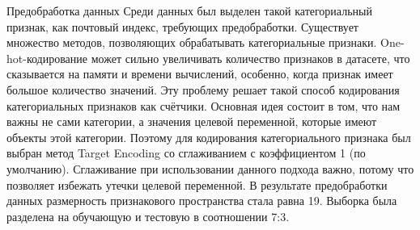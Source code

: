 \documentclass[12pt]{article}
\begin{document}
\begin{section}{Предобработка данных}
Среди данных был выделен такой категориальный признак, как почтовый индекс, требующих предобработки. Существует множество методов, позволяющих обрабатывать категориальные признаки. One-hot-кодирование может сильно увеличивать количество признаков в датасете, что сказывается на памяти и времени вычислений, особенно, когда признак имеет большое количество значений. Эту проблему решает такой способ кодирования категориальных признаков как счётчики. Основная идея состоит в том, что нам важны не сами категории, а значения целевой переменной, которые имеют объекты этой категории. Поэтому для кодирования категориального признака был выбран метод Target Encoding со сглаживанием с коэффициентом 1 (по умолчанию). Сглаживание при использовании данного подхода важно, потому что позволяет избежать утечки целевой переменной. В результате предобработки данных размерность признакового пространства стала равна 19. Выборка была разделена на обучающую и тестовую в соотношении 7:3.
\end{section}
\end{document}
